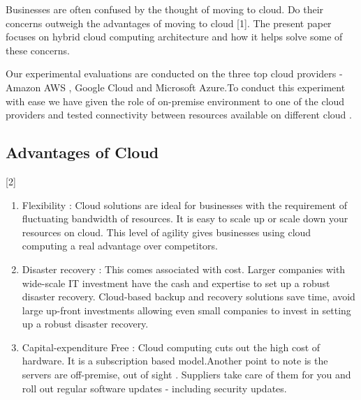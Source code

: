 \documentclass[journal]{hybrid-cloud}
\begin{document}
Businesses are often confused by the thought of moving to cloud. Do their concerns outweigh the advantages of moving to cloud [1]. The present paper focuses on hybrid cloud computing architecture and how it helps solve some of these concerns.

Our experimental evaluations are conducted on the three top cloud providers - Amazon AWS , Google Cloud and Microsoft Azure.To conduct this experiment with ease we have given the role of on-premise environment to one of the cloud providers and tested connectivity between resources available on different cloud .


\subsection{Advantages of Cloud}  [2] 
\begin{enumerate}
	\item Flexibility : Cloud solutions are ideal for businesses with the requirement of fluctuating bandwidth of resources. It is easy to scale up or scale down your resources on cloud. This level of agility gives businesses using cloud computing a real advantage over competitors. 
	\item Disaster recovery : This comes associated with cost. Larger companies with wide-scale IT investment have the cash and expertise to set up a robust disaster recovery. Cloud-based backup and recovery solutions save time, avoid large up-front investments allowing even small companies to invest in setting up a robust disaster recovery.
	\item Capital-expenditure Free : Cloud computing cuts out the high cost of hardware. It is a subscription based model.Another point to note is the servers are off-premise, out of sight . Suppliers take care of them for you and roll out regular software updates - including security updates.
	
	
\end{enumerate}


\end{document}
